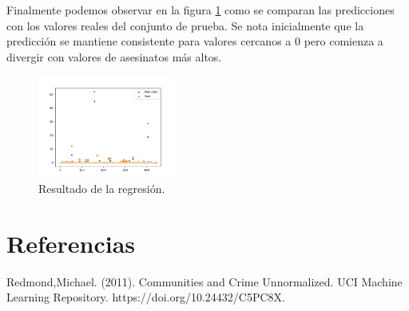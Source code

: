 \documentclass[twocolumn]{article}
\begin{document}
Finalmente podemos observar en la figura \ref{fig:regpreds} como se comparan las predicciones con
los valores reales del conjunto de prueba. Se nota inicialmente que la predicción
se mantiene consistente para valores cercanos a 0 pero comienza a divergir con valores
de asesinatos más altos.


\begin{figure}[!ht]
\centering
\includegraphics[width=0.4\textwidth]{assets/preds.png}
\caption{Resultado de la regresión.}
\label{fig:regpreds}
\end{figure}

\section*{Referencias}
Redmond,Michael. (2011). Communities and Crime Unnormalized. 
UCI Machine Learning Repository. https://doi.org/10.24432/C5PC8X.
\end{document}

